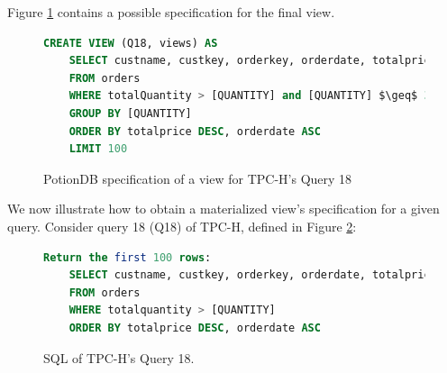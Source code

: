 \documentclass[sigplan,review,anonymous]{acmart}
\begin{document}
Figure \ref{fig:q18_view} contains a possible specification for the final %
view.



\begin{figure}[h]
	\begin{lstlisting}[language=SQL]
	CREATE VIEW (Q18, views) AS
	SELECT custname, custkey, orderkey, orderdate, totalprice, totalquantity
	FROM orders
	WHERE totalQuantity > [QUANTITY] and [QUANTITY] $\geq$ 312 and [QUANTITY] $\leq$ 315
	GROUP BY [QUANTITY]
	ORDER BY totalprice DESC, orderdate ASC
	LIMIT 100
	\end{lstlisting}
	\caption{PotionDB specification of a view for TPC-H's Query 18}
	\label{fig:q18_view}
\end{figure}





We now illustrate how to obtain a materialized view’s specification for a given query. 
Consider query 18 (Q18) of TPC-H, defined in Figure \ref{fig:q18}:

\begin{figure}[h]
	\begin{lstlisting}[language=SQL]
	Return the first 100 rows:
	SELECT custname, custkey, orderkey, orderdate, totalprice, totalquantity
	FROM orders
	WHERE totalquantity > [QUANTITY]
	ORDER BY totalprice DESC, orderdate ASC
	\end{lstlisting}
	\caption{SQL of TPC-H's Query 18.}
	\label{fig:q18}
\end{figure}
\end{document}
